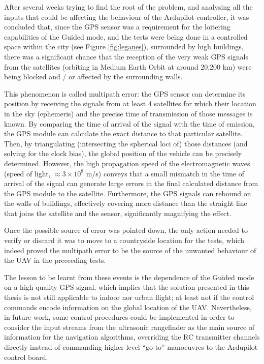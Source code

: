 After several weeks trying to find the root of the problem, and analysing all the inputs that could be affecting the behaviour of the Ardupilot controller, it was concluded that, since the GPS sensor was a requirement for the loitering capabilities of the Guided mode, and the tests were being done in a controlled space within the city (see Figure \ref{fig:leganes}), surrounded by high buildings, there was a significant chance that the reception of the very weak GPS signals from the satellites (orbiting in Medium Earth Orbit at around 20,200 km) were being blocked and / or affected by the surrounding walls.



This phenomenon is called multipath error: the GPS sensor can determine its position by receiving the signals from at least 4 satellites for which their location in the sky (ephemeris) and the precise time of transmission of those messages is known.
By comparing the time of arrival of the signal with the time of emission, the GPS module can calculate the exact distance to that particular satellite.
Then, by triangulating (intersecting the spherical loci of) those distances (and solving for the clock bias), the global position of the vehicle can be precisely determined.
However, the high propagation speed of the electromagnetic waves (speed of light, $\approx 3\times 10^8$ m/s) conveys that a small mismatch in the time of arrival of the signal can generate large errors in the final calculated distance from the GPS module to the satellite.
Furthermore, the GPS signals can rebound on the walls of buildings, effectively covering more distance than the straight line that joins the satellite and the sensor, significantly magnifying the effect.

Once the possible source of error was pointed down, the only action needed to verify or discard it was to move to a countryside location for the tests, which indeed proved the multipath error to be the source of the unwanted behaviour of the UAV in the preceeding tests.

The lesson to be learnt from these events is the dependence of the Guided mode on a high quality GPS signal, which implies that the solution presented in this thesis is not still applicable to indoor nor urban flight; at least not if the control commands encode information on the global location of the UAV.
Nevertheless, in future work, some control procedures could be implemented in order to consider the input streams from the ultrasonic rangefinder as the main source of information for the navigation algorithms, overriding the RC transmitter channels directly instead of commanding higher level ``go-to'' manoeuvres to the Ardupilot control board.

